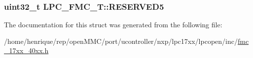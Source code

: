 \hypertarget{structLPC__FMC__T_a374b0f7e9083f242ad88ed5e83202636}{
\subsubsection[{R\-E\-S\-E\-R\-V\-E\-D5}]{ uint32\-\_\-t L\-P\-C\-\_\-\-F\-M\-C\-\_\-\-T\-::\-R\-E\-S\-E\-R\-V\-E\-D5}}\label{structLPC__FMC__T_a374b0f7e9083f242ad88ed5e83202636}


The documentation for this struct was generated from the following file\-:\begin{DoxyCompactItemize}
\item 
/home/henrique/rep/open\-M\-M\-C/port/ucontroller/nxp/lpc17xx/lpcopen/inc/\hyperlink{fmc__17xx__40xx_8h}{fmc\-\_\-17xx\-\_\-40xx.\-h}\end{DoxyCompactItemize}
